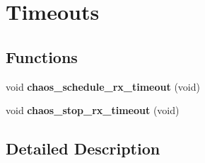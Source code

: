 \hypertarget{group__chaos__timeouts}{\section{Timeouts}
\label{group__chaos__timeouts}
}
\subsection*{Functions}
\begin{DoxyCompactItemize}
\item 
\hypertarget{group__chaos__timeouts_gac6c0ba345d1b6112d1045079ae7737b0}{void {\bfseries chaos\-\_\-schedule\-\_\-rx\-\_\-timeout} (void)}\label{group__chaos__timeouts_gac6c0ba345d1b6112d1045079ae7737b0}

\item 
\hypertarget{group__chaos__timeouts_ga897be1c8ebd1c3e3d3a88634a5ed9145}{void {\bfseries chaos\-\_\-stop\-\_\-rx\-\_\-timeout} (void)}\label{group__chaos__timeouts_ga897be1c8ebd1c3e3d3a88634a5ed9145}

\end{DoxyCompactItemize}


\subsection{Detailed Description}
